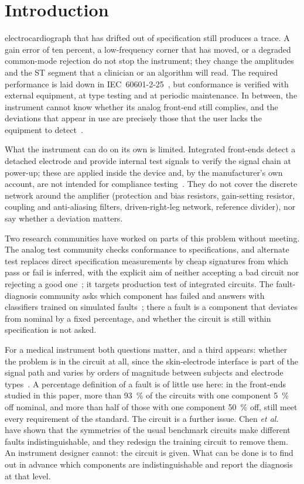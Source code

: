 \section{Introduction}
 electrocardiograph that has drifted out of specification still produces a
trace. A gain error of ten percent, a low-frequency corner that has moved, or a degraded
common-mode rejection do not stop the instrument; they change the amplitudes and the ST segment
that a clinician or an algorithm will read. The required performance is laid down in
IEC~60601-2-25~\cite{iec60601225}, but conformance is verified with external equipment, at type
testing and at periodic maintenance. In between, the instrument cannot know whether its analog
front-end still complies, and the deviations that appear in use are precisely those that the user
lacks the equipment to detect~\cite{chen2025}.

What the instrument can do on its own is limited. Integrated front-ends detect a detached
electrode and provide internal test signals to verify the signal chain at power-up; these are
applied inside the device and, by the manufacturer's own account, are not intended for compliance
testing~\cite{ads1298}. They do not cover the discrete network around the amplifier (protection
and bias resistors, gain-setting resistor, coupling and anti-aliasing filters, driven-right-leg
network, reference divider), nor say whether a deviation matters.

Two research communities have worked on parts of this problem without meeting. The analog test
community checks conformance to specifications, and alternate test replaces direct specification
measurements by cheap signatures from which pass or fail is inferred, with the explicit aim of
neither accepting a bad circuit nor rejecting a good
one~\cite{cheng2010,variyam1998spec,variyam1998synth,voorakaranam2007}; it targets production
test of integrated circuits. The fault-diagnosis community asks which component has failed and
answers with classifiers trained on simulated
faults~\cite{dieste2021,dieste2024,dieste2025,yang2020,rajpal2026}; there a fault is a component
that deviates from nominal by a fixed percentage, and whether the circuit is still within
specification is not asked.

For a medical instrument both questions matter, and a third appears: whether the problem is in
the circuit at all, since the skin-electrode interface is part of the signal path and varies by
orders of magnitude between subjects and electrode types~\cite{joutsen2024}. A percentage
definition of a fault is of little use here: in the front-ends studied in this paper, more than
\SI{93}{\percent} of the circuits with one component \SI{5}{\percent} off nominal, and more than
half of those with one component \SI{50}{\percent} off, still meet every requirement of the
standard. The circuit is a further issue. Chen \emph{et al.}~\cite{chen2025} have shown that the
symmetries of the usual benchmark circuits make different faults indistinguishable, and they
redesign the training circuit to remove them. An instrument designer cannot: the circuit is
given. What can be done is to find out in advance which components are indistinguishable and
report the diagnosis at that level.

